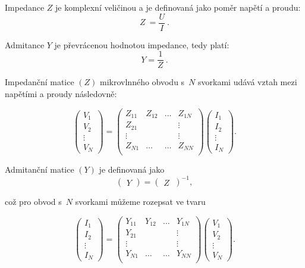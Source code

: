 \documentclass{protokol}
\begin{document}
Impedance $Z$ je komplexní veličinou a je definovaná jako poměr napětí a proudu:
\begin{equation}
	Z~= \frac{U}{I} \:.
\end{equation}

Admitance $Y$ je převrácenou hodnotou impedance, tedy platí:
\begin{equation}
	Y = \frac{1}{Z} \:.
\end{equation}

Impedanční matice $(Z)$ mikrovlnného obvodu s~$N$ svorkami udává vztah mezi napětími a proudy následovně:

\[
\begin{pmatrix}
	V_1     \\
	V_2		\\
	\vdots	\\
	V_N       
\end{pmatrix}
= 
\begin{pmatrix}
	Z_{11} & Z_{12} & \dots & Z_{1N}   \\
	Z_{21} &		& 		& \vdots	\\
	\vdots &		& 		& \vdots	\\
	Z_{N1} & \dots	& \dots & Z_{NN} 	\\    
\end{pmatrix} 
%
\begin{pmatrix}
	I_1     \\
	I_2		\\
	\vdots	\\
	I_N        
\end{pmatrix}
.\]

Admitanční matice $(Y)$ je definovaná jako
\[
\begin{pmatrix}
	Y
\end{pmatrix}
=
\begin{pmatrix}
	Z~\end{pmatrix}^{-1}
,\]

což pro obvod s~$N$ svorkami můžeme rozepsat ve tvaru

\[
\begin{pmatrix}
	I_1     \\
	I_2		\\
	\vdots	\\
	I_N       
\end{pmatrix}
= 
\begin{pmatrix}
	Y_{11} & Y_{12} & \dots & Y_{1N}   \\
	Y_{21} &		& 		& \vdots	\\
	\vdots &		& 		& \vdots	\\
	Y_{N1} & \dots	& \dots & Y_{NN} 	\\    
\end{pmatrix} 
%
\begin{pmatrix}
	V_1     \\
	V_2		\\
	\vdots	\\
	V_N     
\end{pmatrix}
.\]
\end{document}
